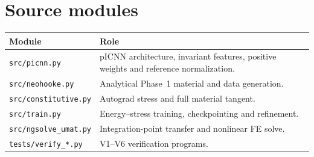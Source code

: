 \documentclass[11pt,a4paper]{article}
\begin{document}
\section{Source modules}

\begin{longtable}{p{}p{}}
  \toprule
  Module & Role\\
  \midrule
  \endhead
  \texttt{src/picnn.py}
    & pICNN architecture, invariant features, positive weights and reference
      normalization.\\
  \texttt{src/neohooke.py}
    & Analytical Phase~1 material and data generation.\\
  \texttt{src/constitutive.py}
    & Autograd stress and full material tangent.\\
  \texttt{src/train.py}
    & Energy--stress training, checkpointing and refinement.\\
  \texttt{src/ngsolve\_umat.py}
    & Integration-point transfer and nonlinear FE solve.\\
  \texttt{tests/verify\_*.py}
    & V1--V6 verification programs.\\
  \bottomrule
\end{longtable}
\end{document}
